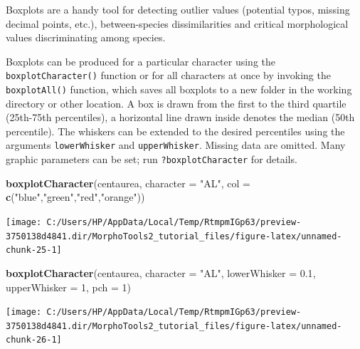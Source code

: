 \documentclass[
]{article}
\newenvironment{Shaded}{\begin{snugshade}}{\end{snugshade}}
\newcommand{\DataTypeTok}[1]{\textcolor[rgb]{0.13,0.29,0.53}{#1}}
\newcommand{\DecValTok}[1]{\textcolor[rgb]{0.00,0.00,0.81}{#1}}
\newcommand{\FloatTok}[1]{\textcolor[rgb]{0.00,0.00,0.81}{#1}}
\newcommand{\KeywordTok}[1]{\textcolor[rgb]{0.13,0.29,0.53}{\textbf{#1}}}
\newcommand{\NormalTok}[1]{#1}
\newcommand{\StringTok}[1]{\textcolor[rgb]{0.31,0.60,0.02}{#1}}
\begin{document}
Boxplots are a handy tool for detecting outlier values (potential typos,
missing decimal points, etc.), between-species dissimilarities and
critical morphological values discriminating among species.

Boxplots can be produced for a particular character using the
\texttt{boxplotCharacter()} function or for all characters at once by
invoking the \texttt{boxplotAll()} function, which saves all boxplots to
a new folder in the working directory or other location. A box is drawn
from the first to the third quartile (25th-75th percentiles), a
horizontal line drawn inside denotes the median (50th percentile). The
whiskers can be extended to the desired percentiles using the arguments
\texttt{lowerWhisker} and \texttt{upperWhisker}. Missing data are
omitted. Many graphic parameters can be set; run
\texttt{?boxplotCharacter} for details.

\begin{Shaded}
\begin{Highlighting}[]
\KeywordTok{boxplotCharacter}\NormalTok{(centaurea, }\DataTypeTok{character =} \StringTok{"AL"}\NormalTok{, }\DataTypeTok{col =} \KeywordTok{c}\NormalTok{(}\StringTok{"blue"}\NormalTok{,}\StringTok{"green"}\NormalTok{,}\StringTok{"red"}\NormalTok{,}\StringTok{"orange"}\NormalTok{))}
\end{Highlighting}
\end{Shaded}

\begin{center}\texttt{[image: C:/Users/HP/AppData/Local/Temp/RtmpmIGp63/preview-3750138d4841.dir/MorphoTools2\_tutorial\_files/figure-latex/unnamed-chunk-25-1]} \end{center}

\begin{Shaded}
\begin{Highlighting}[]
\KeywordTok{boxplotCharacter}\NormalTok{(centaurea, }\DataTypeTok{character =} \StringTok{"AL"}\NormalTok{, }\DataTypeTok{lowerWhisker =} \FloatTok{0.1}\NormalTok{, }\DataTypeTok{upperWhisker =} \DecValTok{1}\NormalTok{, }\DataTypeTok{pch =} \DecValTok{1}\NormalTok{)}
\end{Highlighting}
\end{Shaded}

\begin{center}\texttt{[image: C:/Users/HP/AppData/Local/Temp/RtmpmIGp63/preview-3750138d4841.dir/MorphoTools2\_tutorial\_files/figure-latex/unnamed-chunk-26-1]} \end{center}
\end{document}
